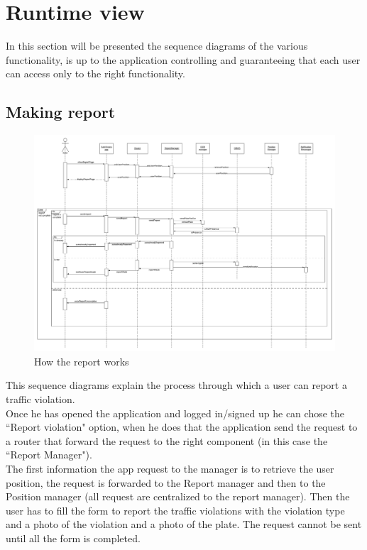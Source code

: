 \documentclass[12pt,a4paper]{report}
\begin{document}
		\section{Runtime view}
			In this section will be presented the sequence diagrams of the various functionality, is up to the application
			controlling and guaranteeing that each user can access only to the right functionality.
			\subsection{Making report}
				\begin{figure}[H]
						\includegraphics[width = 1.5\textwidth, center]{Report}
						\caption{How the report works}
						\label{fig: diagrams}
				\end{figure}
				This sequence diagrams explain the process through which a user can report a traffic violation.\\
				Once he has opened the application and logged in/signed up he can chose the ``Report violation" option,
				when he does that the application send the request to a router that forward the request to the right
				component (in this case the ``Report Manager").\\
				The first information the app request to the manager is to retrieve the user position, the request is forwarded
				to the Report manager and then to the Position manager (all request are centralized to the report manager).
				Then the user has to fill the form to report the traffic violations with the violation type and a photo of the
				violation and a photo of the plate. The request cannot be sent until all the form is completed.\\
\end{document}
